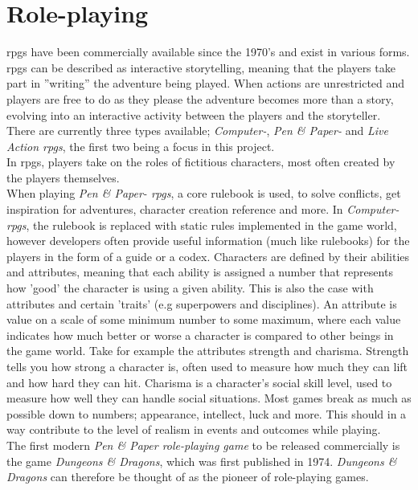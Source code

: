 \section{Role-playing}
\ac{rpgs} have been commercially available since the 1970's and exist in various forms. \ac{rpgs} can be described as interactive storytelling, meaning that the players take part in ''writing'' the adventure being played. When actions are unrestricted and players are free to do as they please the adventure becomes more than a story, evolving into an interactive activity between the players and the storyteller.
There are currently three types available; \emph{Computer-}, \emph{Pen \& Paper-} and \emph{Live Action \ac{rpgs}}, the first two being a focus in this project.\\
In \ac{rpgs}, players take on the roles of fictitious characters, most often created by the players themselves.\\
When playing \emph{Pen \& Paper- \ac{rpgs}}, a core rulebook is used, to solve conflicts, get inspiration for adventures, character creation reference and more. In \emph{Computer- \ac{rpgs}}, the rulebook is replaced with static rules implemented in the game world, however developers often provide useful information (much like rulebooks) for the players in the form of a guide or a codex.
Characters are defined by their abilities and attributes, meaning that each ability is assigned a number that represents how 'good' the character is using a given ability. This is also the case with attributes and certain 'traits' (e.g superpowers and disciplines). An attribute is value on a scale of some minimum number to some maximum, where each value indicates how much better or worse a character is compared to other beings in the game world. Take for example the attributes strength and charisma. Strength tells you how strong a character is, often used to measure how much they can lift and how hard they can hit. Charisma is a character's social skill level, used to measure how well they can handle social situations. Most games break as much as possible down to numbers; appearance, intellect, luck and more.
This should in a way contribute to the level of realism in events and outcomes while playing.\\
The first modern \emph{Pen \& Paper role-playing game} to be released commercially is the game \emph{Dungeons \& Dragons}, which was first published in 1974.\cite{wikidnd}
\emph{Dungeons \& Dragons} can therefore be thought of as the pioneer of role-playing games.

